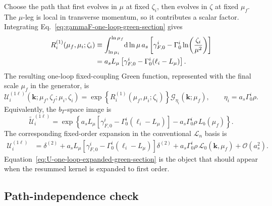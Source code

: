 \documentclass[11pt]{article}
\newcommand{\bk}{\bm{k}}
\newcommand{\dd}{\mathrm{d}}
\newcommand{\deltaT}{\delta^{(2)}}
\newcommand{\order}[1]{\mathcal{O}\!\left(#1\right)}
\begin{document}
Choose the path that first evolves in $\mu$ at fixed $\zeta_i$, then evolves in $\zeta$ at
fixed $\mu_f$. The $\mu$-leg is local in transverse momentum, so it contributes a scalar
factor. Integrating Eq.~\eqref{eq:gammaF-one-loop-green-section} gives
\begin{align}
  R_i^{(1)}(\mu_f,\mu_i;\zeta_i)
  &\equiv
  \int_{\ln\mu_i}^{\ln\mu_f}\!\dd\ln\mu\,
  a_s\left[\gamma_{F,0}^i-\Gamma_0^i\ln\!\left(\frac{\zeta_i}{\mu^2}\right)\right]
  \notag\\
  &=a_sL_\mu\left[\gamma_{F,0}^i-\Gamma_0^i(\ell_i-L_\mu)\right].
  \label{eq:R-one-loop-green-section}
\end{align}
The resulting one-loop fixed-coupling Green function, represented with the final scale
$\mu_f$ in the generator, is
\begin{equation}
  \boxed{
  \mathcal U_i^{(1\ell)}(\bk;\mu_f,\zeta_f;\mu_i,\zeta_i)
  =\exp\!\left\{R_i^{(1)}(\mu_f,\mu_i;\zeta_i)\right\}
  \mathcal G_{\eta_i}(\bk;\mu_f),
  \qquad
  \eta_i=a_s\Gamma_0^i\rho.
  }
  \label{eq:U-one-loop-main-green-section}
\end{equation}
Equivalently, the $b_T$-space image is
\begin{equation}
  \widetilde{\mathcal U}_i^{(1\ell)}
  =\exp\!\left\{
  a_sL_\mu\left[\gamma_{F,0}^i-\Gamma_0^i(\ell_i-L_\mu)\right]
  -a_s\Gamma_0^i\rho\,L_b(\mu_f)
  \right\}.
  \label{eq:U-one-loop-b-green-section}
\end{equation}
The corresponding fixed-order expansion in the conventional $\mathcal L_n$ basis is
\begin{align}
  \mathcal U_i^{(1\ell)}
  &=\deltaT
  +a_sL_\mu\left[\gamma_{F,0}^i-\Gamma_0^i(\ell_i-L_\mu)\right]\deltaT
  +a_s\Gamma_0^i\rho\,\mathcal L_0(\bk,\mu_f)
  +\order{a_s^2}.
  \label{eq:U-one-loop-expanded-green-section}
\end{align}
Equation~\eqref{eq:U-one-loop-expanded-green-section} is the object that should appear
when the resummed kernel is expanded to first order.

\subsection{Path-independence check}
\end{document}
